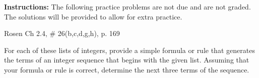 \documentclass[12pt,addpoints]{exam}
\begin{document}
\extrawidth{0.5in} \extrafootheight{-0in} \pagestyle{headandfoot}
\headrule {} \footrule {}

\noindent \textbf{Instructions:} The following practice problems are
not due and are not graded.  The solutions will be provided to allow
for extra practice.

\begin{questions}
\printanswers

\question Rosen Ch 2.4, \# 26(b,c,d,g,h), p. 169
    \ifprintanswers
        \vspace{-10pt}
   \fi
\begin{solution}
For each of these lists of integers, provide a simple formula or rule that generates the terms of an integer sequence that begins with the given list.  Assuming that your formula or rule is correct, determine the next three terms of the sequence. \\


\end{solution}
\end{questions}
\end{document}
